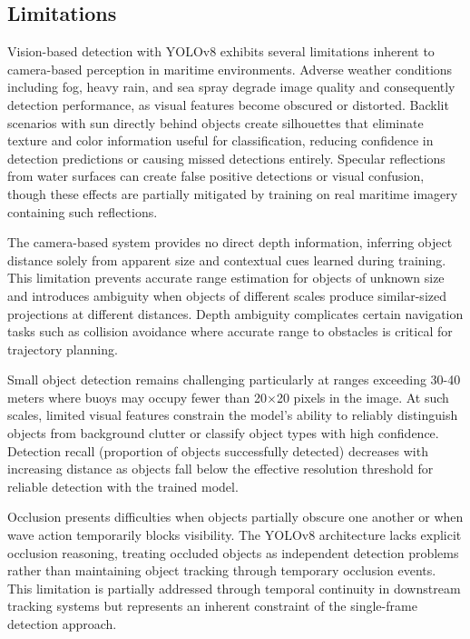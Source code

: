 \subsection{Limitations} \label{sec:yolo_limitations}

Vision-based detection with YOLOv8 exhibits several limitations inherent to camera-based perception in maritime environments.
Adverse weather conditions including fog, heavy rain, and sea spray degrade image quality and consequently detection performance, as visual features become obscured or distorted.
Backlit scenarios with sun directly behind objects create silhouettes that eliminate texture and color information useful for classification, reducing confidence in detection predictions or causing missed detections entirely.
Specular reflections from water surfaces can create false positive detections or visual confusion, though these effects are partially mitigated by training on real maritime imagery containing such reflections.

The camera-based system provides no direct depth information, inferring object distance solely from apparent size and contextual cues learned during training.
This limitation prevents accurate range estimation for objects of unknown size and introduces ambiguity when objects of different scales produce similar-sized projections at different distances.
Depth ambiguity complicates certain navigation tasks such as collision avoidance where accurate range to obstacles is critical for trajectory planning.

Small object detection remains challenging particularly at ranges exceeding 30-40 meters where buoys may occupy fewer than 20×20 pixels in the image.
At such scales, limited visual features constrain the model's ability to reliably distinguish objects from background clutter or classify object types with high confidence.
Detection recall (proportion of objects successfully detected) decreases with increasing distance as objects fall below the effective resolution threshold for reliable detection with the trained model.

Occlusion presents difficulties when objects partially obscure one another or when wave action temporarily blocks visibility.
The YOLOv8 architecture lacks explicit occlusion reasoning, treating occluded objects as independent detection problems rather than maintaining object tracking through temporary occlusion events.
This limitation is partially addressed through temporal continuity in downstream tracking systems but represents an inherent constraint of the single-frame detection approach.

